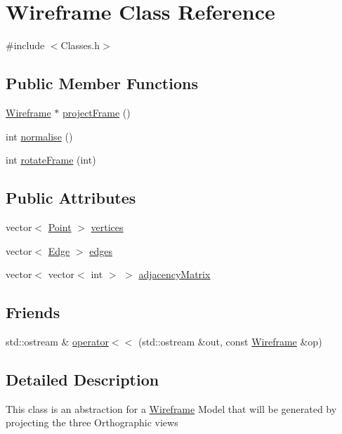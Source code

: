 \hypertarget{class_wireframe}{}\section{Wireframe Class Reference}
\label{class_wireframe}


{\ttfamily \#include $<$Classes.\+h$>$}

\subsection*{Public Member Functions}
\begin{DoxyCompactItemize}
\item 
\hyperlink{class_wireframe}{Wireframe} $\ast$ \hyperlink{class_wireframe_a3ed1a5c8abc099d1eea1495b3b87e52e}{project\+Frame} ()
\item 
int \hyperlink{class_wireframe_ad348b2bb91519338ccdefa0401309a9b}{normalise} ()
\item 
int \hyperlink{class_wireframe_ad3fbb29a285e80d4d3448ea4e3e96d93}{rotate\+Frame} (int)
\end{DoxyCompactItemize}
\subsection*{Public Attributes}
\begin{DoxyCompactItemize}
\item 
vector$<$ \hyperlink{class_point}{Point} $>$ \hyperlink{class_wireframe_a8a327766b43c4260925c0bacab853d02}{vertices}
\item 
vector$<$ \hyperlink{class_edge}{Edge} $>$ \hyperlink{class_wireframe_aef6867295610ed6d02a40c3e3b27700e}{edges}
\item 
vector$<$ vector$<$ int $>$ $>$ \hyperlink{class_wireframe_a0bd14f3c6be92f087fddbbe7e4ddc344}{adjacency\+Matrix}
\end{DoxyCompactItemize}
\subsection*{Friends}
\begin{DoxyCompactItemize}
\item 
std\+::ostream \& \hyperlink{class_wireframe_ad074337c71dffaa7d1c65bf7ddf23e0e}{operator$<$$<$} (std\+::ostream \&out, const \hyperlink{class_wireframe}{Wireframe} \&op)
\end{DoxyCompactItemize}


\subsection{Detailed Description}
This class is an abstraction for a \hyperlink{class_wireframe}{Wireframe} Model that will be generated by projecting the three Orthographic views 


